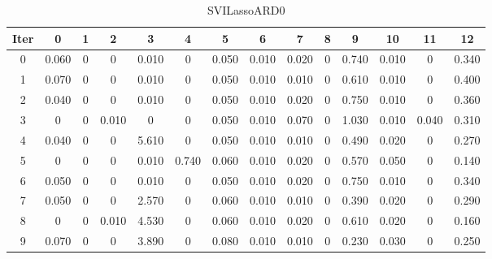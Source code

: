 \begin{table}
	\begin{center}
		\begin{tabular}{|c|c|c|c|c|c|c|c|c|c|c|c|c|c|}
			\hline
			Iter & 0 & 1 & 2 & 3 & 4 & 5 & 6 & 7 & 8 & 9 & 10 & 11 & 12 \\
			\hline
			0 & 0.060 & 0 & 0 & 0.010 & 0 & 0.050 & 0.010 & 0.020 & 0 & 0.740 & 0.010 & 0 & 0.340 \\
			\hline
			1 & 0.070 & 0 & 0 & 0.010 & 0 & 0.050 & 0.010 & 0.010 & 0 & 0.610 & 0.010 & 0 & 0.400 \\
			\hline
			2 & 0.040 & 0 & 0 & 0.010 & 0 & 0.050 & 0.010 & 0.020 & 0 & 0.750 & 0.010 & 0 & 0.360 \\
			\hline
			3 & 0 & 0 & 0.010 & 0 & 0 & 0.050 & 0.010 & 0.070 & 0 & 1.030 & 0.010 & 0.040 & 0.310 \\
			\hline
			4 & 0.040 & 0 & 0 & 5.610 & 0 & 0.050 & 0.010 & 0.010 & 0 & 0.490 & 0.020 & 0 & 0.270 \\
			\hline
			5 & 0 & 0 & 0 & 0.010 & 0.740 & 0.060 & 0.010 & 0.020 & 0 & 0.570 & 0.050 & 0 & 0.140 \\
			\hline
			6 & 0.050 & 0 & 0 & 0.010 & 0 & 0.050 & 0.010 & 0.020 & 0 & 0.750 & 0.010 & 0 & 0.340 \\
			\hline
			7 & 0.050 & 0 & 0 & 2.570 & 0 & 0.060 & 0.010 & 0.010 & 0 & 0.390 & 0.020 & 0 & 0.290 \\
			\hline
			8 & 0 & 0 & 0.010 & 4.530 & 0 & 0.060 & 0.010 & 0.020 & 0 & 0.610 & 0.020 & 0 & 0.160 \\
			\hline
			9 & 0.070 & 0 & 0 & 3.890 & 0 & 0.080 & 0.010 & 0.010 & 0 & 0.230 & 0.030 & 0 & 0.250 \\
			\hline
		\end{tabular}
	\end{center}
	\caption{SVILassoARD0}
\end{table}
